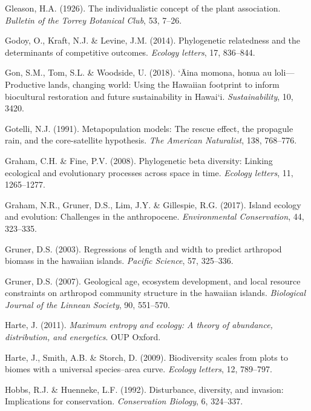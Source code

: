 \documentclass[
  letterpaper,
  DIV=11,
  numbers=noendperiod]{scrartcl}
\newlength{\cslhangindent}
\newenvironment{CSLReferences}[2] %
 {\begin{list}{}{%
  \setlength{\itemindent}{0pt}
  \setlength{\leftmargin}{0pt}
  \setlength{\parsep}{0pt}
  \ifodd #1
   \setlength{\leftmargin}{\cslhangindent}
   \setlength{\itemindent}{-1\cslhangindent}
  \fi
  \setlength{\itemsep}{#2\baselineskip}}}
 {\end{list}}
\begin{document}
\begin{CSLReferences}{1}{0}
Gleason, H.A. (1926). The individualistic concept of the plant
association. \emph{Bulletin of the Torrey Botanical Club}, 53, 7--26.

Godoy, O., Kraft, N.J. \& Levine, J.M. (2014). Phylogenetic relatedness
and the determinants of competitive outcomes. \emph{Ecology letters},
17, 836--844.

Gon, S.M., Tom, S.L. \& Woodside, U. (2018). `Āina momona, honua au
loli---{Productive} lands, changing world: Using the {Hawaiian}
footprint to inform biocultural restoration and future sustainability in
{Hawai`i}. \emph{Sustainability}, 10, 3420.

Gotelli, N.J. (1991). Metapopulation models: The rescue effect, the
propagule rain, and the core-satellite hypothesis. \emph{The American
Naturalist}, 138, 768--776.

Graham, C.H. \& Fine, P.V. (2008). Phylogenetic beta diversity: Linking
ecological and evolutionary processes across space in time.
\emph{Ecology letters}, 11, 1265--1277.

Graham, N.R., Gruner, D.S., Lim, J.Y. \& Gillespie, R.G. (2017). Island
ecology and evolution: Challenges in the anthropocene.
\emph{Environmental Conservation}, 44, 323--335.

Gruner, D.S. (2003). Regressions of length and width to predict
arthropod biomass in the hawaiian islands. \emph{Pacific Science}, 57,
325--336.

Gruner, D.S. (2007). Geological age, ecosystem development, and local
resource constraints on arthropod community structure in the hawaiian
islands. \emph{Biological Journal of the Linnean Society}, 90, 551--570.

Harte, J. (2011). \emph{Maximum entropy and ecology: A theory of
abundance, distribution, and energetics}. OUP Oxford.

Harte, J., Smith, A.B. \& Storch, D. (2009). Biodiversity scales from
plots to biomes with a universal species--area curve. \emph{Ecology
letters}, 12, 789--797.

Hobbs, R.J. \& Huenneke, L.F. (1992). Disturbance, diversity, and
invasion: Implications for conservation. \emph{Conservation Biology}, 6,
324--337.


\end{CSLReferences}
\end{document}
